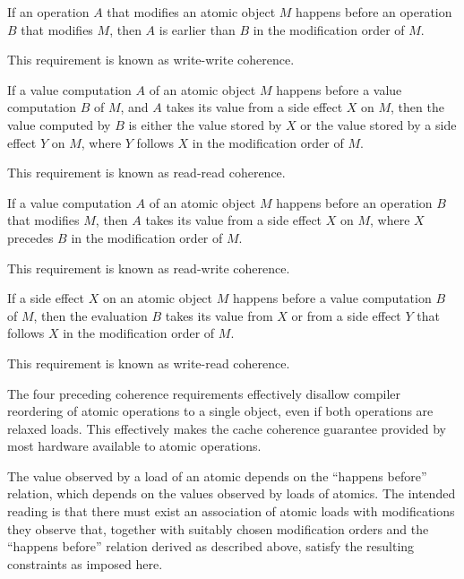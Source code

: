 \pnum
{}%
If an operation $A$ that modifies an atomic object $M$ happens before
an operation $B$ that modifies $M$, then $A$ is earlier
than $B$ in the modification order of $M$.
\begin{note}
This requirement is known as write-write coherence.
\end{note}

\pnum
{}%
If a
%
value computation $A$ of an atomic object $M$ happens before a
value computation $B$ of $M$, and $A$ takes its value from a side
effect $X$ on $M$, then the value computed by $B$ is either
the value stored by $X$ or the value stored by a
%
side effect $Y$ on $M$,
where $Y$ follows $X$ in the modification order of $M$.
\begin{note}
This requirement is known as read-read coherence.
\end{note}

\pnum
{}%
If a
%
value computation $A$ of an atomic object $M$ happens before an
operation $B$ that modifies $M$, then $A$ takes its value from a side
effect $X$ on $M$, where $X$ precedes $B$ in the
modification order of $M$.
\begin{note}
This requirement is known as
read-write coherence.
\end{note}

\pnum
{}%
If a
%
side effect $X$ on an atomic object $M$ happens before a value
computation $B$ of $M$, then the evaluation $B$ takes its
value from $X$ or from a
%
side effect $Y$ that follows $X$ in the modification order of $M$.
\begin{note}
This requirement is known as write-read coherence.
\end{note}

\pnum
\begin{note}
The four preceding coherence requirements effectively disallow
compiler reordering of atomic operations to a single object, even if both
operations are relaxed loads. This effectively makes the cache coherence
guarantee provided by most hardware available to \Cpp{} atomic operations.
\end{note}

\pnum
\begin{note}
The value observed by a load of an atomic depends on the ``happens
before'' relation, which depends on the values observed by loads of atomics.
The intended reading is that there must exist an
association of atomic loads with modifications they observe that, together with
suitably chosen modification orders and the ``happens before'' relation derived
as described above, satisfy the resulting constraints as imposed here.
\end{note}

